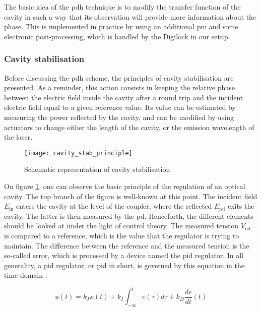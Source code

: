 The basic idea of the \gls{pdh} technique is to modify the transfer function of the cavity in such a way that its observation will provide more information about the phase. This is implemented in practice by using an additional \gls{pm} and some electronic post-processing, which is handled by the Digilock in our setup.

\subsubsection{Cavity stabilisation}

Before discussing the \gls{pdh} scheme, the principles of cavity stabilisation are presented. As a reminder, this action consists in keeping the relative phase between the electric field inside the cavity after a round trip and the incident electric field equal to a given reference value. Its value can be estimated by measuring the power reflected by the cavity, and can be modified by using actuators to change either the length of the cavity, or the emission wavelength of the laser. \\

\begin{figure}
	\centering
	\texttt{[image: cavity\_stab\_principle]}
	\caption{Schematic representation of cavity stabilisation}
	\label{cavity_stab_principle}
\end{figure}

On figure \ref{cavity_stab_principle}, one can observe the basic principle of the regulation of an optical cavity. The top branch of the figure is well-known at this point. The incident field $E_{\text{in}}$ enters the cavity at the level of the coupler, where the reflected $E_{\text{ref}}$ exits the cavity. The latter is then measured by the \gls{pd}. Henceforth, the different elements should be looked at under the light of control theory. The measured tension $V_{\text{ref}}$ is compared to a reference, which is the value that the regulator is trying to maintain. The difference between the reference and the measured tension is the so-called error, which is processed by a device named the \gls{pid} regulator. In all generality, a \gls{pid} regulator, or \gls{pid} in short, is governed by this equation in the time domain \cite[p.196]{franklin2015feedback}:

\begin{equation}
	u(t) = k_P e(t) + k_I \int_{-\infty}^t e(\tau) d\tau + k_D \frac{de}{dt}(t)
\end{equation}

